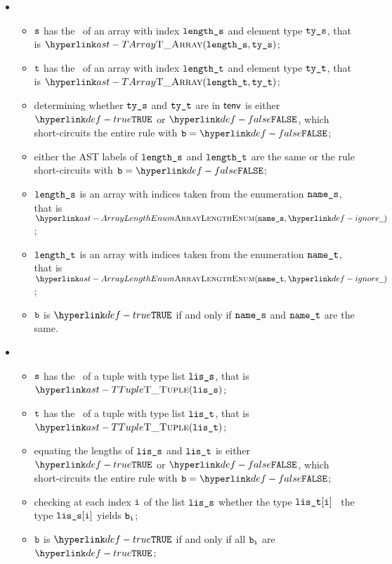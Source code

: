 \begin{itemize}
  \item {}
  \begin{itemize}
  \item $\texttt{s}$ has the \underlyingtype\ of an array with index $\texttt{length\_s}$ and element type $\texttt{ty\_s}$, that is $\TArray(\vlengths, \vtys)$;
  \item $\texttt{t}$ has the \underlyingtype\ of an array with index $\texttt{length\_t}$ and element type $\texttt{ty\_t}$, that is $\TArray(\vlengtht, \vtyt)$;
  \item determining whether $\texttt{ty\_s}$ and $\texttt{ty\_t}$ are \equivalenttypesterm{} in $\textsf{tenv}$ is either $\True$
  or $\False$, which short-circuits the entire rule with $\vb=\False$;
  \item either the AST labels of $\texttt{length\_s}$ and $\texttt{length\_t}$ are the same or the rule short-circuits with $\vb=\False$;
  \item $\texttt{length\_s}$ is an array with indices taken from the enumeration $\texttt{name\_s}$, that is $\ArrayLengthEnum(\vnames, \Ignore)$;
  \item $\texttt{length\_t}$ is an array with indices taken from the enumeration $\texttt{name\_t}$, that is $\ArrayLengthEnum(\vnamet, \Ignore)$;
  \item $\texttt{b}$ is $\True$ if and only if $\texttt{name\_s}$ and $\texttt{name\_t}$ are the same.
  \end{itemize}

\item {}
  \begin{itemize}
  \item $\texttt{s}$ has the \underlyingtype\ of a tuple with type list $\texttt{lis\_s}$, that is $\TTuple(\vlis)$;
  \item $\texttt{t}$ has the \underlyingtype\ of a tuple with type list $\texttt{lis\_t}$, that is $\TTuple(\vlit)$;
  \item equating the lengths of $\texttt{lis\_s}$ and $\texttt{lis\_t}$ is either $\True$ or $\False$, which short-circuits
  the entire rule with $\vb=\False$;
  \item checking at each index $\texttt{i}$ of the list $\texttt{lis\_s}$ whether the type $\texttt{lis\_t}[\texttt{i}]$ \typesatisfies\ the type $\texttt{lis\_s}[\texttt{i}]$
  yields $\texttt{b}_{\texttt{i}}$\ProseOrTypeError;
  \item $\texttt{b}$ is $\True$ if and only if all $\texttt{b}_{\texttt{i}}$ are $\True$;
  \end{itemize}


\end{itemize}
